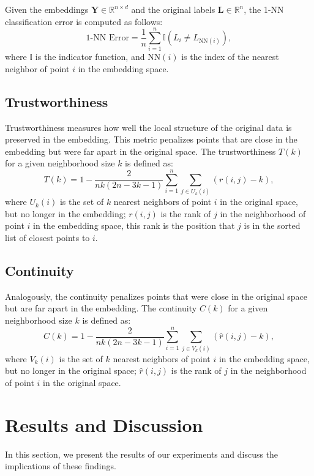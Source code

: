         Given the embeddings $\boldsymbol{Y} \in \mathbb{R}^{n \times d}$ and the original labels $\boldsymbol{L} \in \mathbb{R}^{n}$, the 1-NN classification error is computed as follows:
        \begin{equation}
            \text{1-NN Error} = \frac{1}{n} \sum_{i=1}^{n} \mathbb{I}(L_i \neq L_{\text{NN}(i)}),
        \end{equation}
        where $\mathbb{I}$ is the indicator function, and $\text{NN}(i)$ is the index of the nearest neighbor of point $i$ in the embedding space.

    \subsection{Trustworthiness}
        Trustworthiness measures how well the local structure of the original data is preserved in the embedding. This metric penalizes points that are close in the embedding but were far apart in the original space. The trustworthiness $T(k)$ for a given neighborhood size $k$ is defined as:
        \begin{equation}
            T(k) = 1 - \frac{2}{nk(2n - 3k - 1)} \sum_{i=1}^{n} \sum_{j \in U_k(i)} (r(i,j) - k),
        \end{equation}
        where $U_k(i)$ is the set of $k$ nearest neighbors of point $i$ in the original space, but no longer in the embedding; $r(i,j)$ is the rank of $j$ in the neighborhood of point $i$ in the embedding space, this rank is the position that $j$ is in the sorted list of closest points to $i$.

    \subsection{Continuity}
        Analogously, the continuity penalizes points that were close in the original space but are far apart in the embedding. The continuity $C(k)$ for a given neighborhood size $k$ is defined as:
        \begin{equation}
            C(k) = 1 - \frac{2}{nk(2n - 3k - 1)} \sum_{i=1}^{n} \sum_{j \in V_k(i)} (\hat{r}(i,j) - k),
        \end{equation}
        where $V_k(i)$ is the set of $k$ nearest neighbors of point $i$ in the embedding space, but no longer in the original space; $\hat{r}(i,j)$ is the rank of $j$ in the neighborhood of point $i$ in the original space.

    \section{Results and Discussion}
        In this section, we present the results of our experiments and discuss the implications of these findings.

